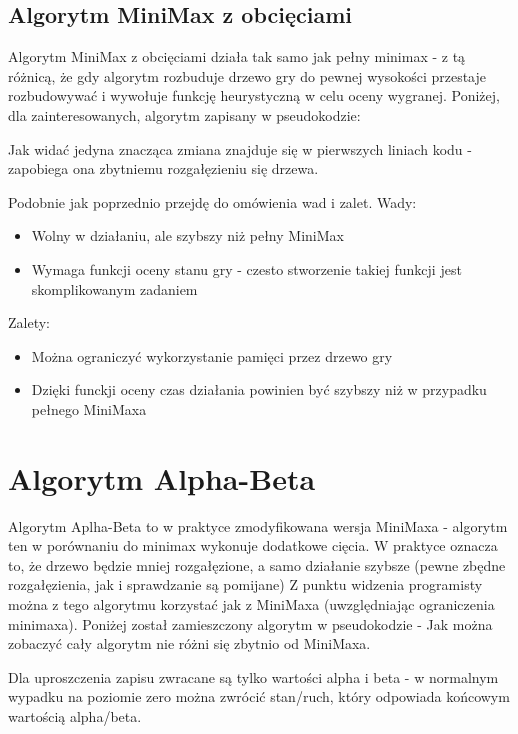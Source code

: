 \documentclass[polish,shortabstract,inz]{iithesis}
\begin{document}
\subsection{Algorytm MiniMax z obcięciami}
Algorytm MiniMax z obcięciami działa tak samo jak pełny minimax - z tą różnicą, że gdy algorytm rozbuduje drzewo gry do pewnej wysokości przestaje rozbudowywać i wywołuje funkcję heurystyczną w celu oceny wygranej.
Poniżej, dla zainteresowanych, algorytm zapisany w pseudokodzie:

\newpage

Jak widać jedyna znacząca zmiana znajduje się w pierwszych liniach kodu - zapobiega ona zbytniemu rozgałęzieniu się drzewa.

Podobnie jak poprzednio przejdę do omówienia wad i zalet.
\newline Wady:
\begin{itemize}
  \item Wolny w działaniu, ale szybszy niż pełny MiniMax
  \item Wymaga funkcji oceny stanu gry - czesto stworzenie takiej funkcji jest skomplikowanym zadaniem
\end{itemize}
Zalety:
\begin{itemize}
  \item Można ograniczyć wykorzystanie pamięci przez drzewo gry
  \item Dzięki funckji oceny czas działania powinien być szybszy niż w przypadku pełnego MiniMaxa
\end{itemize}



\section{Algorytm Alpha-Beta}
Algorytm Aplha-Beta to w praktyce zmodyfikowana wersja MiniMaxa - algorytm ten w porównaniu do minimax wykonuje dodatkowe cięcia.
W praktyce oznacza to, że drzewo będzie mniej rozgałęzione, a samo działanie szybsze (pewne zbędne rozgałęzienia, jak i sprawdzanie są pomijane)
Z punktu widzenia programisty można z tego algorytmu korzystać jak z MiniMaxa (uwzględniając ograniczenia minimaxa).
Poniżej został zamieszczony algorytm w pseudokodzie - Jak można zobaczyć cały algorytm nie różni się zbytnio od MiniMaxa.

\newpage

Dla uproszczenia zapisu zwracane są tylko wartości alpha i beta - w normalnym wypadku na poziomie zero można zwrócić stan/ruch, który odpowiada końcowym wartością alpha/beta.
\end{document}
